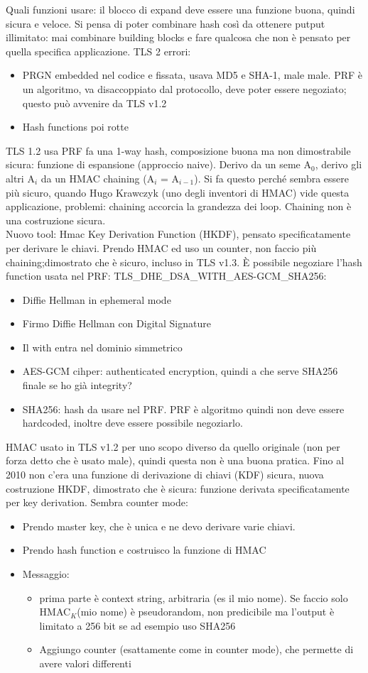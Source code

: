 \documentclass[16px]{article}
\begin{document}
Quali funzioni usare: il blocco di expand deve essere una funzione buona, quindi sicura e veloce. Si pensa di poter combinare hash così da ottenere putput illimitato: mai combinare building blocks e fare qualcosa che non è pensato per quella specifica applicazione. TLS 2 errori:
\begin{itemize}
\item PRGN embedded nel codice e fissata, usava MD5 e SHA-1, male male. PRF è un algoritmo, va disaccoppiato dal protocollo, deve poter essere negoziato; questo può avvenire da TLS v1.2
\item Hash functions poi rotte
\end{itemize}
TLS 1.2 usa PRF fa una 1-way hash, composizione buona ma non dimostrabile sicura: funzione di espansione  (approccio naive). Derivo da un seme A$_{0}$, derivo gli altri A$_{i}$ da un HMAC chaining (A$_{i}$ = A$_{i-1}$). Si fa questo perché sembra essere più sicuro, quando Hugo Krawczyk (uno degli inventori di HMAC) vide questa applicazione, problemi: chaining accorcia la grandezza dei loop. Chaining non è una costruzione sicura.\\ Nuovo tool: Hmac Key Derivation Function (HKDF), pensato specificatamente per derivare le chiavi. Prendo HMAC ed uso un counter, non faccio più chaining;dimostrato che è sicuro, incluso in TLS v1.3. È possibile negoziare l'hash function usata nel PRF: TLS\_DHE\_DSA\_WITH\_AES-GCM\_SHA256:
\begin{itemize}
\item Diffie Hellman in ephemeral mode
\item Firmo Diffie Hellman con Digital Signature
\item Il with entra nel dominio simmetrico
\item AES-GCM cihper: authenticated encryption, quindi a che serve SHA256 finale se ho già integrity?
\item SHA256: hash da usare nel PRF. PRF è algoritmo quindi non deve essere hardcoded, inoltre deve essere possibile negoziarlo.
\end{itemize}
HMAC usato in TLS v1.2 per uno scopo diverso da quello originale (non per forza detto che è usato male), quindi questa non è una buona pratica. Fino al 2010 non c'era una funzione di derivazione di chiavi (KDF) sicura, nuova costruzione HKDF, dimostrato che è sicura: funzione derivata specificatamente per key derivation. Sembra counter mode: 
\begin{itemize}
\item Prendo master key, che è unica e ne devo derivare varie chiavi.
\item Prendo hash function e costruisco la funzione di HMAC
\item Messaggio: 
\begin{itemize}
\item prima parte è context string, arbitraria (es il mio nome). Se faccio solo HMAC$_K$(mio nome) è pseudorandom, non predicibile ma l'output è limitato a 256 bit se ad esempio uso SHA256
\item Aggiungo counter (esattamente come in counter mode), che permette di avere valori differenti
\end{itemize}
\end{itemize}
\end{document}
